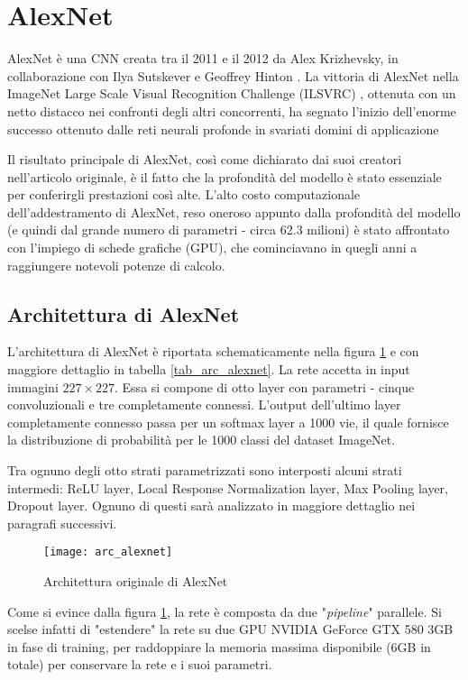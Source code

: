 \section{AlexNet}\label{alexnet}
AlexNet è una CNN creata tra il 2011 e il 2012 da Alex Krizhevsky, in collaborazione con Ilya Sutskever e Geoffrey Hinton \cite{alexnet}. La vittoria di AlexNet nella ImageNet Large Scale Visual Recognition Challenge (ILSVRC) \cite{imagenet2012}, ottenuta con un netto distacco nei confronti degli altri concorrenti, ha segnato l'inizio dell'enorme successo ottenuto dalle reti neurali profonde in svariati domini di applicazione \cite{historydl}

Il risultato principale di AlexNet, così come dichiarato dai suoi creatori nell'articolo originale, è il fatto che la profondità del modello è stato essenziale per conferirgli prestazioni così alte. L'alto costo computazionale dell'addestramento di AlexNet, reso oneroso appunto dalla profondità del modello (e quindi dal grande numero di parametri - circa 62.3 milioni) è stato affrontato con l'impiego di schede grafiche (GPU), che cominciavano in quegli anni a raggiungere notevoli potenze di calcolo.

\subsection{Architettura di AlexNet}
L'architettura di AlexNet è riportata schematicamente nella figura \ref{arc_alexnet} e con maggiore dettaglio in tabella \ref{tab_arc_alexnet}.
La rete accetta in input immagini $227\times 227$. Essa si compone di otto layer con parametri - cinque convoluzionali e tre completamente connessi. L'output dell'ultimo layer completamente connesso passa per un softmax layer a 1000 vie, il quale fornisce la distribuzione di probabilità per le 1000 classi del dataset ImageNet.

Tra ognuno degli otto strati parametrizzati sono interposti alcuni strati intermedi: ReLU layer, Local Response Normalization layer, Max Pooling layer, Dropout layer. Ognuno di questi sarà analizzato in maggiore dettaglio nei paragrafi successivi.

\begin{figure}[h]
\centering
\texttt{[image: arc\_alexnet]}
\caption{Architettura originale di AlexNet \cite{alexnet}}
\label{arc_alexnet}
\end{figure}

Come si evince dalla figura \ref{arc_alexnet}, la rete è composta da due "\textit{pipeline}" parallele. Si scelse infatti di "estendere" la rete su due GPU NVIDIA\textsuperscript{\textregistered} GeForce\textsuperscript{\textregistered} GTX 580 3GB in fase di training, per raddoppiare la memoria massima disponibile (6GB in totale) per conservare la rete e i suoi parametri.

